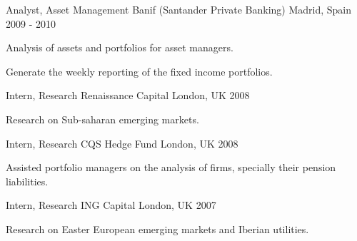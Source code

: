 \begin{cventries}
\cventry
    {Analyst, Asset Management} %
    {Banif (Santander Private Banking)} %
    {Madrid, Spain} %
    {2009 - 2010} %
    {
        \begin{cvitems} %
            \item {Analysis of assets and portfolios for asset managers.}
            \item {Generate the weekly reporting of the fixed income portfolios.}
        \end{cvitems}
    }

\cventry
    {Intern, Research} %
    {Renaissance Capital} %
    {London, UK} %
    {2008} %
    {
        \begin{cvitems} %
            \item {Research on Sub-saharan emerging markets.}
        \end{cvitems}
    }

\cventry
    {Intern, Research} %
    {CQS Hedge Fund} %
    {London, UK} %
    {2008} %
    {
        \begin{cvitems} %
            \item {Assisted portfolio managers on the analysis of firms, specially their pension liabilities.}
        \end{cvitems}
    }

\cventry
    {Intern, Research} %
    {ING Capital} %
    {London, UK} %
    {2007} %
    {
        \begin{cvitems} %
            \item {Research on Easter European emerging markets and Iberian utilities.}
        \end{cvitems}
    }

\end{cventries}
